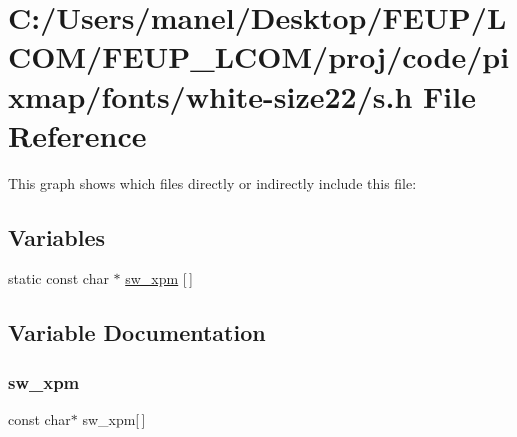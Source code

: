 \hypertarget{white-size22_2s_8h}{}\section{C\+:/\+Users/manel/\+Desktop/\+F\+E\+U\+P/\+L\+C\+O\+M/\+F\+E\+U\+P\+\_\+\+L\+C\+O\+M/proj/code/pixmap/fonts/white-\/size22/s.h File Reference}
\label{white-size22_2s_8h}
This graph shows which files directly or indirectly include this file\+:
\subsection*{Variables}
\begin{DoxyCompactItemize}
\item 
static const char $\ast$ \mbox{\hyperlink{white-size22_2s_8h_aeb1f845c2c8fab44bb92840995825390}{sw\+\_\+xpm}} \mbox{[}$\,$\mbox{]}
\end{DoxyCompactItemize}


\subsection{Variable Documentation}
\mbox{\label{white-size22_2s_8h_aeb1f845c2c8fab44bb92840995825390}} 
\subsubsection{\texorpdfstring{sw\_xpm}{sw\_xpm}}
{\footnotesize\ttfamily const char$\ast$ sw\+\_\+xpm\mbox{[}$\,$\mbox{]}\hspace{0.3cm}{\ttfamily [static]}}

